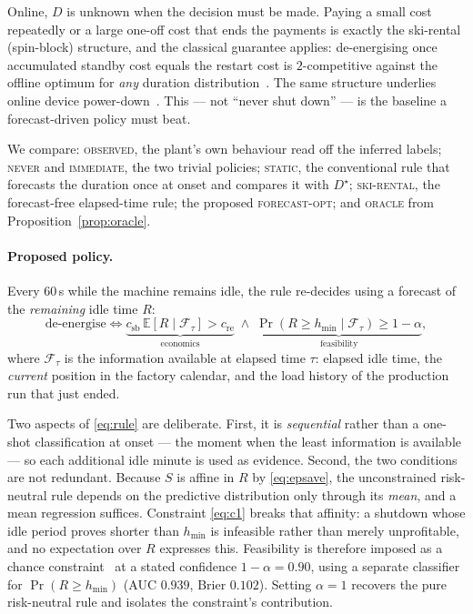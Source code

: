 Online, $D$ is unknown when the decision must be made. Paying a small
cost repeatedly or a large one-off cost that ends the payments is
exactly the ski-rental (spin-block) structure, and the classical
guarantee applies: de-energising once accumulated standby cost equals
the restart cost is $2$-competitive against the offline optimum for
\emph{any} duration distribution~\cite{karlin1994competitive,karlin1988competitive}.
The same structure underlies online device power-down~\cite{irani2003online}.
This --- not ``never shut down'' --- is the baseline a forecast-driven
policy must beat.

We compare: \textsc{observed}, the plant's own behaviour read off the
inferred labels; \textsc{never} and \textsc{immediate}, the two trivial
policies; \textsc{static}, the conventional rule that forecasts the
duration once at onset and compares it with $D^{\star}$;
\textsc{ski-rental}, the forecast-free elapsed-time rule; the proposed
\textsc{forecast-opt}; and \textsc{oracle} from
Proposition~\ref{prop:oracle}.

\paragraph{Proposed policy.}
Every $60$\,s while the machine remains idle, the rule re-decides using
a forecast of the \emph{remaining} idle time $R$:
\begin{equation}
\label{eq:rule}
\text{de-energise} \iff
\underbrace{c_{\text{sb}}\,\mathbb{E}[R \mid \mathcal{F}_\tau] > c_{\text{re}}}_{\text{economics}}
\;\wedge\;
\underbrace{\Pr(R \ge h_{\min} \mid \mathcal{F}_\tau) \ge 1-\alpha}_{\text{feasibility}} ,
\end{equation}
where $\mathcal{F}_\tau$ is the information available at elapsed time
$\tau$: elapsed idle time, the \emph{current} position in the factory
calendar, and the load history of the production run that just ended.

Two aspects of \eqref{eq:rule} are deliberate. First, it is
\emph{sequential} rather than a one-shot classification at onset --- the
moment when the least information is available --- so each additional
idle minute is used as evidence. Second, the two conditions are not
redundant. Because $S$ is affine in $R$ by \eqref{eq:epsave}, the
unconstrained risk-neutral rule depends on the predictive distribution
only through its \emph{mean}, and a mean regression suffices. Constraint
\eqref{eq:c1} breaks that affinity: a shutdown whose idle period proves
shorter than $h_{\min}$ is infeasible rather than merely unprofitable,
and no expectation over $R$ expresses this. Feasibility is therefore
imposed as a chance constraint~\cite{charnes1959chance} at a stated
confidence $1-\alpha = 0.90$, using a separate classifier for
$\Pr(R\ge h_{\min})$ (AUC $0.939$, Brier $0.102$). Setting $\alpha=1$
recovers the pure risk-neutral rule and isolates the constraint's
contribution.

